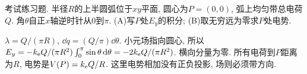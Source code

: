 \begin{exercise}
考试练习题. 半径$R$的上半圆弧位于$xy$平面, 圆心为$P=(0,0)$, 弧上均匀带总电荷$Q$. 角$\theta$自正$x$轴逆时针从0到$\pi$. (A)写$P$处$E_y$的积分; (B)取无穷远为零求$P$处电势.
\end{exercise}
\begin{solution}
$\lambda=Q/(\pi R)$, $\dd q=(Q/\pi)\dd\theta$. 小元场指向圆心, 所以
$E_y=-k_{\mathrm e} Q/(\pi R^2)\int_0^\pi\sin\theta\,\mathrm d\theta=-2k_{\mathrm e} Q/(\pi R^2)$.
横向分量为零. 所有电荷到$P$距离为$R$, 电势是$V(P)=k_{\mathrm e} Q/R$. 这里电势相加没有正负投影, 场则必须带方向.
\end{solution}
